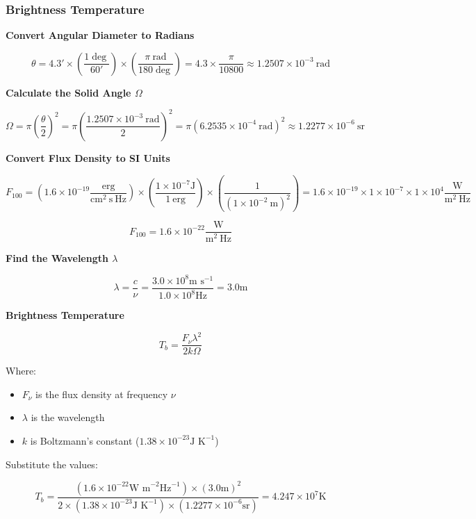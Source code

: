 \documentclass[12pt]{article}
\begin{document}
\subsubsection{Brightness Temperature}

\bigskip

\textbf{Convert Angular Diameter to Radians}

{\footnotesize
    \[
        \theta = 4.3' \times \left( \dfrac{1\deg}{60'} \right) \times \left( \dfrac{\pi\ \text{rad}}{180\deg} \right) = 4.3 \times \dfrac{\pi}{10800} \approx 1.2507 \times 10^{-3}\ \text{rad}
    \]
}

\textbf{Calculate the Solid Angle $\Omega$}

{\footnotesize
    \[
        \Omega = \pi {\left( \dfrac{\theta}{2} \right)}^2 = \pi {\left( \dfrac{1.2507 \times 10^{-3}\ \text{rad}}{2} \right)}^2 = \pi {\left( 6.2535 \times 10^{-4}\ \text{rad} \right)}^2 \approx 1.2277 \times 10^{-6}\ \text{sr}
    \]
}

\textbf{Convert Flux Density to SI Units}

{\tiny
    \[
        F_{100} = \left(1.6 \times 10^{-19} \frac{\text{erg}}{\text{cm}^2\ \text{s}\ \text{Hz}}\right) \times \left( \dfrac{1 \times 10^{-7}\text{J}}{1\ \text{erg}} \right) \times \left( \dfrac{1}{{(1 \times 10^{-2}\ \text{m})}^2} \right) = 1.6 \times 10^{-19} \times 1 \times 10^{-7} \times 1 \times 10^{4} \frac{\text{W}}{\text{m}^2\ \text{Hz}}
    \]
}

\[
    F_{100} = 1.6 \times 10^{-22} \frac{\text{W}}{\text{m}^2\ \text{Hz}}
\]

\textbf{Find the Wavelength $\lambda$}

\[
    \lambda = \dfrac{c}{\nu} = \dfrac{3.0 \times 10^8\text{m s}^{-1}}{1.0 \times 10^8\text{Hz}} = 3.0\text{m}
\]

\textbf{Brightness Temperature}

\[
    T_b = \dfrac{F_\nu \lambda^2}{2 k \Omega}
\]

Where:
\begin{itemize}
    \item $F_\nu$ is the flux density at frequency $\nu$
    \item $\lambda$ is the wavelength
    \item $k$ is Boltzmann's constant ($1.38 \times 10^{-23}\text{J K}^{-1}$)
\end{itemize}

Substitute the values:

\[
    T_b = \dfrac{(1.6 \times 10^{-22}\text{W m}^{-2}\text{Hz}^{-1}) \times {(3.0\text{m})}^2}{2 \times (1.38 \times 10^{-23}\text{J K}^{-1}) \times (1.2277 \times 10^{-6}\text{sr})} = 4.247 \times 10^{7}\text{K}
\]
\end{document}
